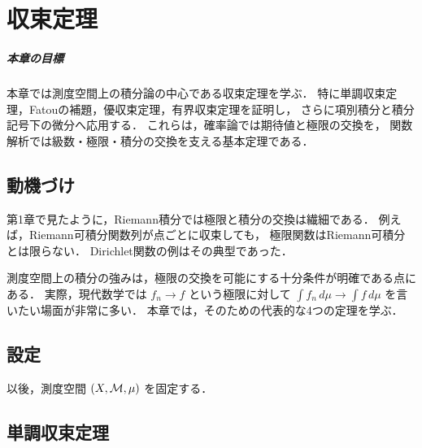 \setcounter{chapter}{9}
\chapter{収束定理}

\paragraph{本章の目標}
本章では測度空間上の積分論の中心である収束定理を学ぶ．
特に単調収束定理，Fatouの補題，優収束定理，有界収束定理を証明し，
さらに項別積分と積分記号下の微分へ応用する．
これらは，確率論では期待値と極限の交換を，
関数解析では級数・極限・積分の交換を支える基本定理である．

\section{動機づけ}

第1章で見たように，Riemann積分では極限と積分の交換は繊細である．
例えば，Riemann可積分関数列が点ごとに収束しても，
極限関数はRiemann可積分とは限らない．
Dirichlet関数の例はその典型であった．

測度空間上の積分の強みは，極限の交換を可能にする十分条件が明確である点にある．
実際，現代数学では $f_n \to f$ という極限に対して
$\int f_n\,d\mu \to \int f\,d\mu$ を言いたい場面が非常に多い．
本章では，そのための代表的な4つの定理を学ぶ．

\section{設定}

以後，測度空間 $(X,\mathcal M,\mu)$ を固定する．

\section{単調収束定理}


